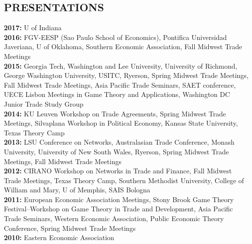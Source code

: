 \documentclass[11pt]{res}
\begin{document}
\begin{resume}
\section{PRESENTATIONS}\vspace{1.5mm}
{\bf 2017:} U of Indiana \vspace{1.5mm}\\
{\bf 2016:} FGV-EESP (Sao Paulo School of Economics), Pontifica Universidad Javeriana, U of Oklahoma, Southern Economic Association, Fall Midwest Trade Meetings\vspace{1.5mm}\\
{\bf 2015:} Georgia Tech, Washington and Lee University, University of Richmond, George Washington University, USITC, Ryerson, Spring Midwest Trade Meetings, Fall Midwest Trade Meetings, Asia Pacific Trade Seminars, SAET conference, UECE Lisbon Meetings in Game Theory and Applications, Washington DC Junior Trade Study Group\vspace{1.5mm}\\



\phantom{.}\vspace{.05cm}
{\bf 2014:} KU Leuven Workshop on Trade Agreements, Spring Midwest Trade Meetings, Silvaplana Workshop in Political Economy, Kansas State University, Texas Theory Camp\vspace{1.5mm}\\
{\bf 2013:} LSU Conference on Networks, Australasian Trade Conference, Monash University, University of New South Wales, Ryerson, Spring Midwest Trade Meetings, Fall Midwest Trade Meetings \vspace{1.5mm}\\
{\bf 2012:}  CIRANO Workshop on Networks in Trade and Finance, Fall Midwest Trade Meetings, Texas Theory Camp, Southern Methodist University, College of William and Mary, U of Memphis, SAIS Bologna\vspace{1.5mm}\\
{\bf 2011:} European Economic Association Meetings, Stony Brook Game Theory Festival--Workshop on Game Theory in Trade and Development, Asia Pacific Trade Seminars, Western Economic Association, Public Economic Theory Conference, Spring Midwest Trade Meetings\vspace{1.5mm}\\
{\bf 2010:} Eastern Economic Association \vspace{1.5mm}\\


\end{resume}
\end{document}
